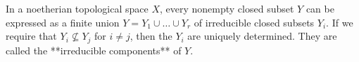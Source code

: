 In a noetherian topological space $X$, every nonempty closed subset $Y$ can be expressed as a finite union $Y = Y_1 \cup \ldots \cup Y_r$ of irreducible closed subsets $Y_i$. If we require that $Y_i \nsubseteq Y_j$ for $i \neq j$, then the $Y_i$ are uniquely determined. They are called the **irreducible components** of $Y$.
